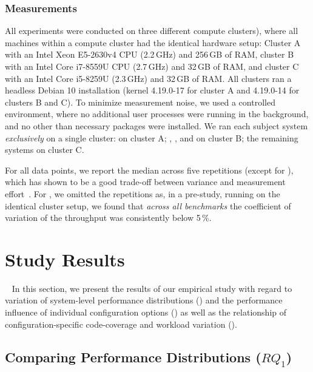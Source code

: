 {\subsubsection{Measurements}\label{sec:measurement_setup}
All experiments were conducted on three different compute clusters), where all machines within a compute cluster had the identical hardware setup: Cluster \textsf{A} with an Intel Xeon E5-2630v4 CPU (2.2\,GHz) and 256\,GB of RAM, cluster \textsf{B}  with an Intel Core i7-8559U CPU (2.7\,GHz) and 32\,GB of RAM, and cluster \textsf{C} with an Intel Core i5-8259U (2.3\,GHz) and 32\,GB of RAM. All clusters ran a headless Debian 10 installation (kernel 4.19.0-17 for cluster \textsf{A} and 4.19.0-14 for clusters \textsf{B} and \textsf{C}). To minimize measurement noise, we used a controlled environment, where no additional user processes were running in the background, and no other than necessary packages were installed. 
We ran each subject system \textit{exclusively} on a single cluster: \htwo on cluster \textsf{A}; \dconvert, \batik, and \jadx on cluster \textsf{B}; the remaining systems on cluster \textsf{C}.

For all data points, we report the median across five repetitions (except for \htwo), which has shown to be a good trade-off between variance and measurement effort~\cite{molyneauxArtApplicationPerformance2015}. For \htwo, we omitted the repetitions as, in a pre-study, running on the identical cluster setup, we found that \textit{across all benchmarks} the coefficient of variation of the throughput was consistently below 5\,\%.

\section{Study Results}~\label{sec:results}
In this section, we present the results of our empirical study with regard to variation of system-level performance distributions () and the performance influence of individual configuration options () as well as the relationship of configuration-specific code-coverage and workload variation (). 

\subsection{Comparing Performance Distributions ($RQ_1$)}\label{sec:rq1}
}
